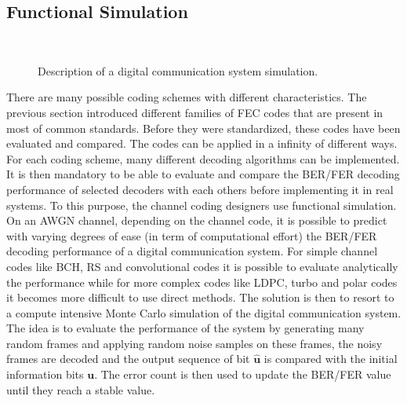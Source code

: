 \subsection{Functional Simulation}
\label{sec:ctx_simulation}

\begin{figure}[htp]
  \centering
  \\
  \caption{Description of a digital communication system simulation.}
  \label{fig:ctx_simu_com_chain}
\end{figure}

There are many possible coding schemes with different characteristics. The
previous section introduced different families of FEC codes that are present in
most of common standards. Before they were standardized, these codes have been
evaluated and compared. The codes can be applied in a infinity of different
ways. For each coding scheme, many different decoding algorithms can be
implemented. It is then mandatory to be able to evaluate and compare the BER/FER
decoding performance of selected decoders with each others before implementing
it in real systems. To this purpose, the channel coding designers use functional
simulation. On an AWGN channel, depending on the channel code, it is possible to
predict with varying degrees of ease (in term of computational effort) the
BER/FER decoding performance of a digital communication system. For simple
channel codes like BCH, RS and convolutional codes it is possible to evaluate
analytically the performance while for more complex codes like LDPC, turbo and
polar codes it becomes more difficult to use direct methods. The solution is
then to resort to a compute intensive Monte Carlo simulation of the digital
communication system. The idea is to evaluate the performance of the system by
generating many random frames and applying random noise samples on these frames,
the noisy frames are decoded and the output sequence of bit $\bm{\hat{u}}$ is
compared with the initial information bits $\bm{u}$. The error count is then
used to update the BER/FER value until they reach a stable value.

